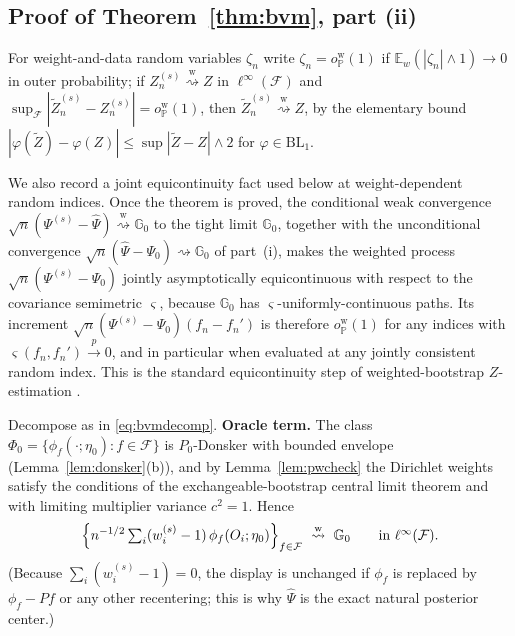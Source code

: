 \documentclass[11pt]{article}
\newcommand{\E}{\mathbb E}
\newcommand{\Pp}{\mathbb P}
\newcommand{\G}{\mathbb G}
\newcommand{\opro}{o_{\Pp}}
\newcommand{\dto}{\rightsquigarrow}
\newcommand{\dtow}{\overset{\mathrm w}{\rightsquigarrow}}
\newcommand{\pto}{\overset{p}{\to}}
\newcommand{\calF}{\mathcal F}
\newcommand{\hPsi}{\widehat\Psi}
\newcommand{\BL}{\mathrm{BL}_1}
\begin{document}
\subsection{Proof of Theorem~\ref{thm:bvm}, part (ii)}\label{app:bvm}

For weight-and-data random variables $\zeta_n$ write $\zeta_n=\opro^{\mathrm w}(1)$
if $\E_w(|\zeta_n|\wedge1)\to0$ in outer probability; 
if $Z_n^{(s)}\dtow Z$ in $\ell^\infty(\calF)$ and $\sup_\calF|\tilde Z_n^{(s)}-Z_n^{(s)}|=\opro^{\mathrm w}(1)$, then $\tilde Z_n^{(s)}\dtow Z$, by the elementary bound $|\varphi(\tilde Z)-\varphi(Z)|\le\sup|\tilde Z-Z|\wedge2$ for $\varphi\in\BL$.

We also record a joint equicontinuity fact used below at weight-dependent random indices. Once the theorem is proved, the conditional weak convergence $\sqrt n(\Psi^{(s)}-\hPsi)\dtow\G_0$ to the tight limit $\G_0$, together with the unconditional convergence $\sqrt n(\hPsi-\Psi_0)\dto\G_0$ of part~\textup{(i)}, makes the weighted process $\sqrt n(\Psi^{(s)}-\Psi_0)$ jointly asymptotically equicontinuous with respect to the covariance semimetric $\varsigma$, because $\G_0$ has $\varsigma$-uniformly-continuous paths. Its increment $\sqrt n(\Psi^{(s)}-\Psi_0)(f_n-f_n')$ is therefore $\opro^{\mathrm w}(1)$ for any indices with $\varsigma(f_n,f_n')\pto0$, and in particular when evaluated at any jointly consistent random index. This is the standard equicontinuity step of weighted-bootstrap $Z$-estimation \citep{cheng2010}.

Decompose as in \eqref{eq:bvmdecomp}. \textbf{Oracle term.} The class $\Phi_0=\{\phi_f(\cdot;\eta_0):f\in\calF\}$ is $P_0$-Donsker with bounded envelope (Lemma~\ref{lem:donsker}(b)), and by Lemma~\ref{lem:pwcheck} the Dirichlet weights satisfy the conditions of the exchangeable-bootstrap central limit theorem \citep[Theorem~2.2]{praestgaard1993} and \citep[Theorem~3.6.13]{vdvwellner1996} with limiting multiplier variance $c^2=1$. Hence
\begin{equation}\label{eq:oracleconv}
\Bigl\{n^{-1/2}\textstyle\sum_i(w^{(s)}_i-1)\,\phi_f(O_i;\eta_0)\Bigr\}_{f\in\calF}\ \dtow\ \G_0
\qquad\text{in }\ell^\infty(\calF).
\end{equation}
(Because $\sum_i(w_i^{(s)}-1)=0$, the display is unchanged if $\phi_f$ is replaced by $\phi_f-Pf$ or any other recentering; this is why $\hPsi$ is the exact natural posterior center.)
\end{document}
